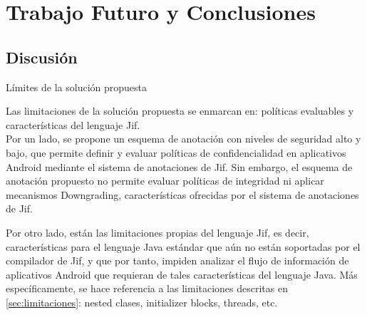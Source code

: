 \label{ch:trabajoFuturo}
\chapter{Trabajo Futuro y Conclusiones}
\section{Discusión}
Límites de la solución propuesta\newline

Las limitaciones de la solución propuesta se enmarcan en: políticas evaluables y
características del lenguaje Jif.\\
Por un lado, se propone un esquema de anotación con niveles de seguridad alto y
bajo, que permite definir y evaluar políticas de confidencialidad en aplicativos
Android mediante el sistema de anotaciones de Jif.
Sin embargo, el esquema de anotación propuesto no permite evaluar políticas de
integridad ni aplicar mecanismos Downgrading, características ofrecidas por el
sistema de anotaciones de Jif.

Por otro lado, están las limitaciones propias del lenguaje Jif, es decir,
características para el lenguaje Java estándar que aún no están soportadas por
el compilador de Jif, y que por tanto, impiden analizar el flujo de información
de aplicativos Android que requieran de tales características del lenguaje Java.
Más específicamente, se hace referencia a las limitaciones descritas en
\ref{sec:limitaciones}: nested clases, initializer blocks, threads, etc.



